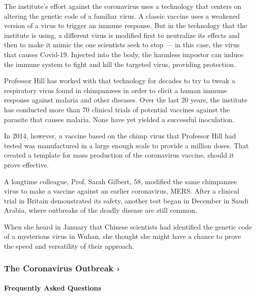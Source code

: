 The institute's effort against the coronavirus uses a technology that
centers on altering the genetic code of a familiar virus. A classic
vaccine uses a weakened version of a virus to trigger an immune
response. But in the technology that the institute is using, a different
virus is modified first to neutralize its effects and then to make it
mimic the one scientists seek to stop --- in this case, the virus that
causes Covid-19. Injected into the body, the harmless impostor can
induce the immune system to fight and kill the targeted virus, providing
protection.

Professor Hill has worked with that technology for decades to try to
tweak a respiratory virus found in chimpanzees in order to elicit a
human immune response against malaria and other diseases. Over the last
20 years, the institute has conducted more than 70 clinical trials of
potential vaccines against the parasite that causes malaria. None have
yet yielded a successful inoculation.

In 2014, however, a vaccine based on the chimp virus that Professor Hill
had tested was manufactured in a large enough scale to provide a million
doses. That created a template for mass production of the coronavirus
vaccine, should it prove effective.

A longtime colleague, Prof. Sarah Gilbert, 58, modified the same
chimpanzee virus to make a vaccine against an earlier coronavirus, MERS.
After a clinical trial in Britain demonstrated its safety, another test
began in December in Saudi Arabia, where outbreaks of the deadly disease
are still common.

When she heard in January that Chinese scientists had identified the
genetic code of a mysterious virus in Wuhan, she thought she might have
a chance to prove the speed and versatility of their approach.

\href{https://www.nytimes3xbfgragh.onion/news-event/coronavirus?action=click\&pgtype=Article\&state=default\&region=MAIN_CONTENT_3\&context=storylines_faq}{}

\hypertarget{the-coronavirus-outbreak-}{%
\subsubsection{The Coronavirus Outbreak
›}\label{the-coronavirus-outbreak-}}

\hypertarget{frequently-asked-questions}{%
\paragraph{Frequently Asked
Questions}\label{frequently-asked-questions}}

